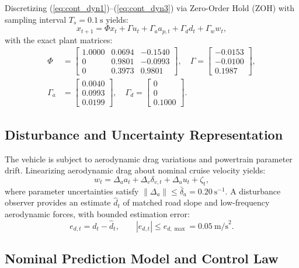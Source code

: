 \documentclass[journal]{IEEEtran}
\begin{document}
Discretizing (\ref{eq:cont_dyn1})--(\ref{eq:cont_dyn3}) via Zero-Order Hold (ZOH) with sampling interval $T_s = 0.1~\text{s}$ yields:
\begin{equation}
x_{t+1} = \Phi x_t + \Gamma u_t + \Gamma_a a_{p,t} + \Gamma_d d_t + \Gamma_w w_t,
\label{eq:disc_sys}
\end{equation}
with the exact plant matrices:
\begin{align}
\Phi &= \begin{bmatrix} 1.0000 & 0.0694 & -0.1540 \\ 0 & 0.9801 & -0.0993 \\ 0 & 0.3973 & 0.9801 \end{bmatrix}, \quad
\Gamma = \begin{bmatrix} -0.0153 \\ -0.0100 \\ 0.1987 \end{bmatrix}, \\
\Gamma_a &= \begin{bmatrix} 0.0040 \\ 0.0993 \\ 0.0199 \end{bmatrix}, \quad
\Gamma_d = \begin{bmatrix} 0 \\ 0 \\ 0.1000 \end{bmatrix}.
\end{align}

\subsection{Disturbance and Uncertainty Representation}

The vehicle is subject to aerodynamic drag variations and powertrain parameter drift. Linearizing aerodynamic drag about nominal cruise velocity yields:
\begin{equation}
w_t = \Delta_a a_t + \Delta_v \delta_{v,t} + \Delta_u u_t + \zeta_t,
\end{equation}
where parameter uncertainties satisfy $\|\Delta_a\| \le \bar\delta_a = 0.20~\text{s}^{-1}$. A disturbance observer provides an estimate $\hat d_t$ of matched road slope and low-frequency aerodynamic forces, with bounded estimation error:
\begin{equation}
e_{d,t} = d_t - \hat d_t, \qquad |e_{d,t}| \le e_{d,\max} = 0.05~\text{m/s}^2.
\end{equation}

\subsection{Nominal Prediction Model and Control Law}
\end{document}
